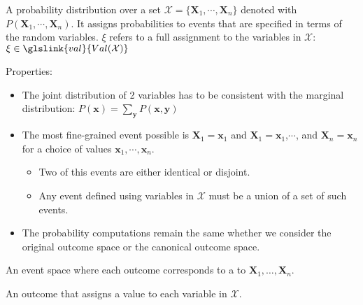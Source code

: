 {%
  A \gls{probability distribution} over a set $\mathcal{X}=\{\bm{X}_1,\cdots,\bm{X}_n\}$ denoted with $P(\bm{X}_1,\cdots,\bm{X}_n)$. It assigns probabilities to events that are specified in terms of the \glspl{random variable}. $\xi$ refers to a full assignment to the variables in $\mathcal{X}$: $\xi\in\glslink{val}{Val(\mathcal{X})}$

  Properties:
  \begin{itemize}
    \item The joint distribution of 2 variables has to be consistent with the \gls{marginal distribution}: $P(\bm{x})=\sum_{\bm{y}}P(\bm{x},\bm{y})$
    \item The most fine-grained event possible is $\bm{X}_1=\bm{x}_1$ and $\bm{X}_1=\bm{x}_1$,$\cdots$, and $\bm{X}_n=\bm{x}_n$ for a choice of values $\bm{x}_1,\cdots,\bm{x}_n$.
    \begin{itemize}
      \item Two of this events are either identical or disjoint.
      \item Any event defined using variables in $\mathcal{X}$ must be a union of a set of such events.
    \end{itemize}
    \item The probability computations remain the same whether we consider the original outcome space or the \gls{canonical outcome space}.
  \end{itemize}

}

{%
  An \gls{event space} where each outcome corresponds to a  to $\bm{X}_1,\dots, \bm{X}_n$.
}

{%
  An outcome that assigns a value to each variable in $\mathcal{X}$.
}

